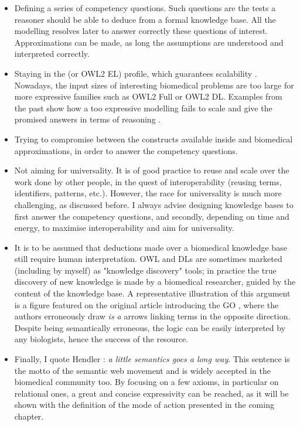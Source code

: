\begin{itemize}
  \item Defining a series of competency questions. Such questions are the tests a reasoner should be able to deduce from a formal knowledge base. All the modelling resolves later to answer correctly these questions of interest. Approximations can be made, as long the assumptions are understood and interpreted correctly.
  \item Staying in the  (or OWL2 EL) profile, which guarantees scalability \citep{hoehndorf2011common}. Nowadays, the input sizes of interesting biomedical problems are too large for more expressive families such as OWL2 Full or OWL2 DL. Examples from the past show how a too expressive modelling fails to scale and give the promised answers in terms of reasoning \citep{vempati2012formalization} \citep{golbreich2006foundational} \citep{mungall2010integrating} \citep{mungall2011cross} \citep{villanueva2008yowl}.
  \item Trying to compromise between the constructs available inside  and biomedical approximations, in order to answer the competency questions.
  \item Not aiming for universality. It is of good practice to reuse and scale over the work done by other people, in the quest of interoperability (reusing terms, identifiers, patterns, etc.). However, the race for universality is much more challenging, as discussed before. I always advise designing knowledge bases to first answer the competency questions, and secondly, depending on time and energy, to maximise interoperability and aim for universality.
  \item It is to be assumed that deductions made over a biomedical knowledge base still require human interpretation. OWL and DLs are sometimes marketed (including by myself) as "knowledge discovery" tools; in practice the true discovery of new knowledge is made by a biomedical researcher, guided by the content of the knowledge base. A representative illustration of this argument is a figure featured on the original article introducing the GO \citep{ashburner2000gene}, where the authors erroneously draw \emph{is a} arrows linking terms in the opposite direction. Despite being semantically erroneous, the logic can be easily interpreted by any biologists, hence the success of the resource.
  \item Finally, I quote Hendler \citep{littlesemantics}: \emph{a little semantics goes a long way}. This sentence is the motto of the semantic web movement and is widely accepted in the biomedical community too. By focusing on a few axioms, in particular on relational ones, a great and concise expressivity can be reached, as it will be shown with the definition of the mode of action presented in the coming chapter.
\end{itemize}

